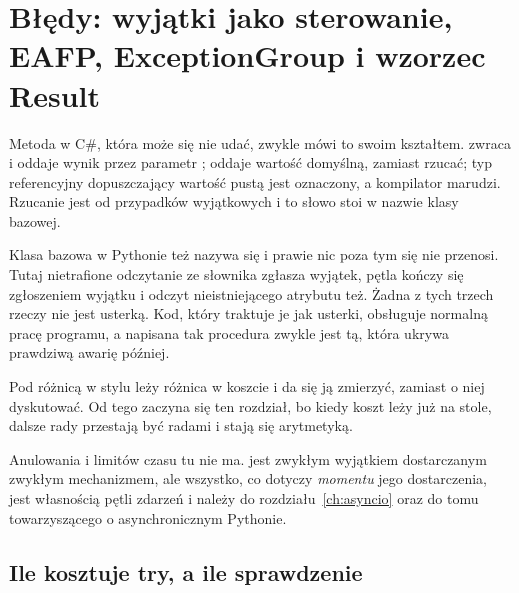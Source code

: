 
\chapter{Błędy: wyjątki jako sterowanie, EAFP, ExceptionGroup i wzorzec Result}
\label{ch:errors}

\noindent
Metoda w C\#, która może się nie udać, zwykle mówi to swoim kształtem.
 zwraca  i oddaje wynik przez parametr
;  oddaje wartość domyślną, zamiast rzucać; typ
referencyjny dopuszczający wartość pustą jest oznaczony, a kompilator marudzi. Rzucanie
jest od przypadków wyjątkowych i to słowo stoi w nazwie klasy bazowej.

Klasa bazowa w Pythonie też nazywa się  i prawie nic
poza tym się nie przenosi. Tutaj nietrafione odczytanie ze słownika zgłasza
wyjątek, pętla  kończy się zgłoszeniem wyjątku i odczyt
nieistniejącego atrybutu też. Żadna z tych trzech rzeczy nie jest usterką.
Kod, który traktuje je jak usterki, obsługuje normalną pracę programu, a
napisana tak procedura zwykle jest tą, która ukrywa prawdziwą awarię później.

Pod różnicą w stylu leży różnica w koszcie i da się ją zmierzyć, zamiast o
niej dyskutować. Od tego zaczyna się ten rozdział, bo kiedy koszt leży już na
stole, dalsze rady przestają być radami i stają się arytmetyką.

\begin{note}
Anulowania i limitów czasu tu nie ma.  jest zwykłym
wyjątkiem dostarczanym zwykłym mechanizmem, ale wszystko, co dotyczy
\emph{momentu} jego dostarczenia, jest własnością pętli zdarzeń i należy do
rozdziału~\ref{ch:asyncio} oraz do tomu towarzyszącego o asynchronicznym
Pythonie.
\end{note}

\section{Ile kosztuje try, a ile sprawdzenie}
\label{sec:ch06-cost}

